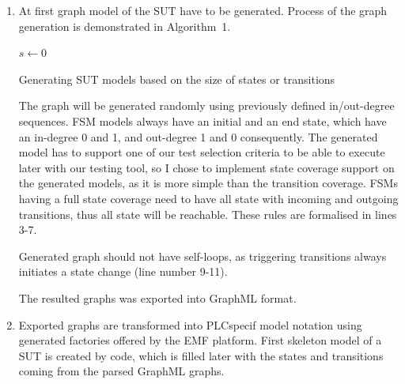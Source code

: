 \begin{enumerate}
	\item At first graph model of the SUT have to be generated. Process of the graph generation is demonstrated in Algorithm~1.
	
\begin{algorithm}
\label{alg:sutmodelgeneration}
\SetAlgoLined
{}
$s \leftarrow 0$\;
\caption{Generating SUT models based on the size of states or transitions}
\end{algorithm}

	The graph will be generated randomly using previously defined in/out-degree sequences. FSM models always have an initial and an end state, which have an in-degree 0 and 1, and out-degree 1 and 0 consequently. The generated model has to support one of our test selection criteria to be able to execute later with our testing tool, so I chose to implement state coverage support on the generated models, as it is more simple than the transition coverage. FSMs having a full state coverage need to have all state with incoming and outgoing transitions, thus all state will be reachable. These rules are formalised in lines 3-7.
	
	Generated graph should not have self-loops, as triggering transitions always initiates a state change (line number 9-11).
	
	The resulted graphs was exported into GraphML format.
	
	\item  Exported graphs are transformed into PLCspecif model notation using generated factories offered by the EMF platform. First skeleton model of a SUT is created by code, which is filled later with the states and transitions coming from the parsed GraphML graphs.
	
\end{enumerate}


